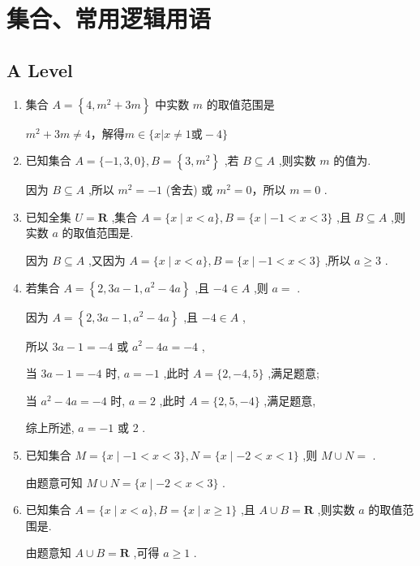 \section*{集合、常用逻辑用语}
\subsection*{A Level}
\begin{enumerate}
    \item 集合 $A = \left\{  {4,{m}^{2} + {3m}}\right\}$ 中实数 $m$ 的取值范围是
    \begin{jieda}
        ${m}^{2} + {3m} \neq 4$，解得$m \in \{x | x \neq 1 \text{或} -4\}$
    \end{jieda}
    \item 已知集合 $A = \{  - 1,3,0\} ,B = \left\{  {3,{m}^{2}}\right\}$ ,若 $B \subseteq  A$ ,则实数 $m$ 的值为.
    \begin{jieda}
        因为 $B \subseteq  A$ ,所以 ${m}^{2} =  - 1$ (舍去) 或 ${m}^{2} = 0$，所以 $m = 0$ .
    \end{jieda}
    \item 已知全集 $U = \mathbf{R}$ ,集合 $A = \{ x \mid  x < a\} ,B = \{ x \mid   - 1 < x < 3\}$ ,且 $B \subseteq  A$ ,则实数 $a$ 的取值范围是\blkda[4]{$[3, +\infty)$}.
    \begin{jieda}
        因为 $B \subseteq  A$ ,又因为 $A = \{ x \mid  x < a\} ,B = \{ x \mid   - 1 < x < 3\}$ ,所以 $a \geq  3$ .
    \end{jieda}
    \item 若集合 $A = \left\{  {2,{3a} - 1,{a}^{2} - {4a}}\right\}$ ,且 $- 4 \in  A$ ,则 $a =$ .
    \begin{jieda}
        因为 $A = \left\{  {2,{3a} - 1,{a}^{2} - {4a}}\right\}$ ,且 $- 4 \in  A$ ,
        
        所以 ${3a} - 1 =  - 4$ 或 ${a}^{2} - {4a} =  - 4$ ,
        
        当 ${3a} - 1 =  - 4$ 时, $a =  - 1$ ,此时 $A = \{ 2, - 4,5\}$ ,满足题意;
        
        当 ${a}^{2} - {4a} =  - 4$ 时, $a = 2$ ,此时 $A = \{ 2,5, - 4\}$ ,满足题意,
        
        综上所述, $a =  - 1$ 或 2 .
    \end{jieda}
    \item 已知集合 $M = \{ x \mid   - 1 < x < 3\} ,N = \{ x \mid   - 2 < x < 1\}$ ,则 $M \cup  N =$ .
    \begin{jieda}
        由题意可知 $M \cup  N = \{ x \mid   - 2 < x < 3\}$ .
    \end{jieda}
    \item 已知集合 $A = \{ x \mid  x < a\} ,B = \{ x \mid  x \geq  1\}$ ,且 $A \cup  B = \mathbf{R}$ ,则实数 $a$ 的取值范围是.
    \begin{jieda}
        由题意知 $A \cup  B = \mathbf{R}$ ,可得 $a \geq  1$ .
    \end{jieda}
    

\end{enumerate}
